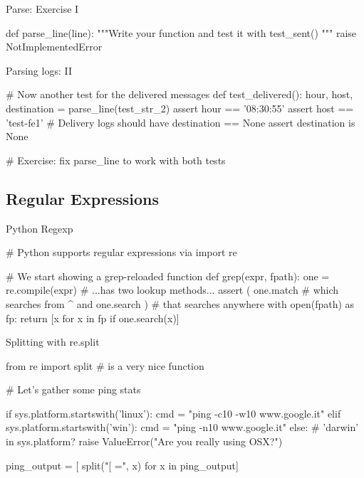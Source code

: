 \begin{frame}[fragile]{Parse: Exercise I }
\begin{pythoncode}
def parse_line(line):
    """Write your function and test it
        with test_sent()
    """
    raise NotImplementedError
\end{pythoncode}
\end{frame}


\begin{frame}[fragile]{Parsing logs: II}
\begin{pythoncode}
# Now another test for the delivered messages
def test_delivered():
    hour, host, destination = parse_line(test_str_2)
    assert hour == '08:30:55'
    assert host == 'test-fe1'
    # Delivery logs should have destination == None
    assert destination is None

# Exercise: fix parse_line to work with both tests
\end{pythoncode}
\end{frame}


\subsection{Regular Expressions}

\begin{frame}[fragile]{Python Regexp}
\begin{pythoncode}
# Python supports regular expressions via
import re

# We start showing a grep-reloaded function
def grep(expr, fpath):
    one = re.compile(expr) 
    # ...has two lookup methods...
    assert ( one.match    # which searches from ^
         and one.search ) # that searches anywhere
    with open(fpath) as fp:
        return [x for x in fp if one.search(x)]

\end{pythoncode}
\end{frame}

\begin{frame}[fragile]{Splitting with re.split}
\begin{pythoncode}
from re import split # is a very nice function

# Let's gather some ping stats

if sys.platform.startswith('linux'):
    cmd = "ping -c10 -w10 www.google.it"
elif sys.platform.startswith('win'):
    cmd = "ping -n10 www.google.it"    
else: # 'darwin' in sys.platform?
    raise ValueError("Are you really using OSX?")
    
ping_output = [ split("[ =", x) for x in ping_output]

\end{pythoncode}
\end{frame}


